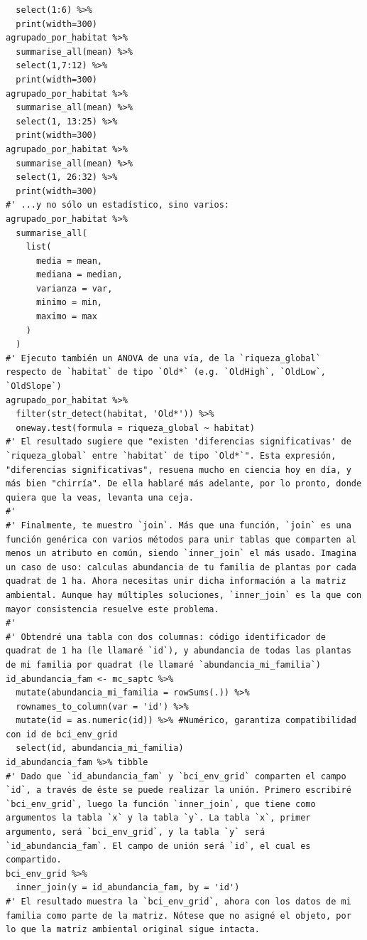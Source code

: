 \documentclass[11pt,]{article}
\begin{document}
\begin{verbatim}
  select(1:6) %>% 
  print(width=300)
agrupado_por_habitat %>%
  summarise_all(mean) %>% 
  select(1,7:12) %>% 
  print(width=300)
agrupado_por_habitat %>%
  summarise_all(mean) %>% 
  select(1, 13:25) %>% 
  print(width=300)
agrupado_por_habitat %>%
  summarise_all(mean) %>% 
  select(1, 26:32) %>%
  print(width=300)
#' ...y no sólo un estadístico, sino varios:
agrupado_por_habitat %>%
  summarise_all(
    list(
      media = mean,
      mediana = median,
      varianza = var,
      minimo = min,
      maximo = max
    )
  )
#' Ejecuto también un ANOVA de una vía, de la `riqueza_global` respecto de `habitat` de tipo `Old*` (e.g. `OldHigh`, `OldLow`, `OldSlope`)
agrupado_por_habitat %>%
  filter(str_detect(habitat, 'Old*')) %>%
  oneway.test(formula = riqueza_global ~ habitat)
#' El resultado sugiere que "existen 'diferencias significativas' de `riqueza_global` entre `habitat` de tipo `Old*`". Esta expresión, "diferencias significativas", resuena mucho en ciencia hoy en día, y más bien "chirría". De ella hablaré más adelante, por lo pronto, donde quiera que la veas, levanta una ceja.
#' 
#' Finalmente, te muestro `join`. Más que una función, `join` es una función genérica con varios métodos para unir tablas que comparten al menos un atributo en común, siendo `inner_join` el más usado. Imagina un caso de uso: calculas abundancia de tu familia de plantas por cada quadrat de 1 ha. Ahora necesitas unir dicha información a la matriz ambiental. Aunque hay múltiples soluciones, `inner_join` es la que con mayor consistencia resuelve este problema.
#' 
#' Obtendré una tabla con dos columnas: código identificador de quadrat de 1 ha (le llamaré `id`), y abundancia de todas las plantas de mi familia por quadrat (le llamaré `abundancia_mi_familia`)
id_abundancia_fam <- mc_saptc %>%
  mutate(abundancia_mi_familia = rowSums(.)) %>% 
  rownames_to_column(var = 'id') %>%
  mutate(id = as.numeric(id)) %>% #Numérico, garantiza compatibilidad con id de bci_env_grid
  select(id, abundancia_mi_familia)
id_abundancia_fam %>% tibble
#' Dado que `id_abundancia_fam` y `bci_env_grid` comparten el campo `id`, a través de éste se puede realizar la unión. Primero escribiré `bci_env_grid`, luego la función `inner_join`, que tiene como argumentos la tabla `x` y la tabla `y`. La tabla `x`, primer argumento, será `bci_env_grid`, y la tabla `y` será `id_abundancia_fam`. El campo de unión será `id`, el cual es compartido.
bci_env_grid %>%
  inner_join(y = id_abundancia_fam, by = 'id')
#' El resultado muestra la `bci_env_grid`, ahora con los datos de mi familia como parte de la matriz. Nótese que no asigné el objeto, por lo que la matriz ambiental original sigue intacta.

\end{verbatim}
\end{document}
